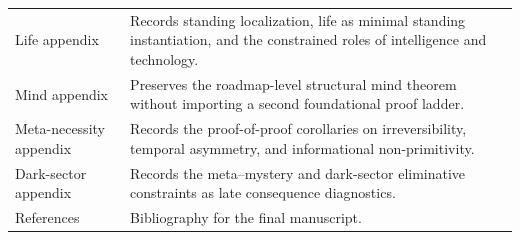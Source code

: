 \begin{longtable}{P{0.28\textwidth}P{0.62\textwidth}}
Life appendix & Records standing localization, life as minimal standing instantiation, and the constrained roles of intelligence and technology. \\
Mind appendix & Preserves the roadmap-level structural mind theorem without importing a second foundational proof ladder. \\
Meta-necessity appendix & Records the proof-of-proof corollaries on irreversibility, temporal asymmetry, and informational non-primitivity. \\
Dark-sector appendix & Records the meta--mystery and dark-sector eliminative constraints as late consequence diagnostics. \\
References & Bibliography for the final manuscript. \\
\end{longtable}